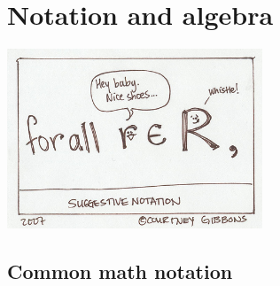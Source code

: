 \documentclass[12pt]{extarticle}
\begin{document}
\section{Notation and algebra}

\begin{center}
\includegraphics[width=3in]{notation}
\end{center}

\subsection{Common math notation}
\end{document}
